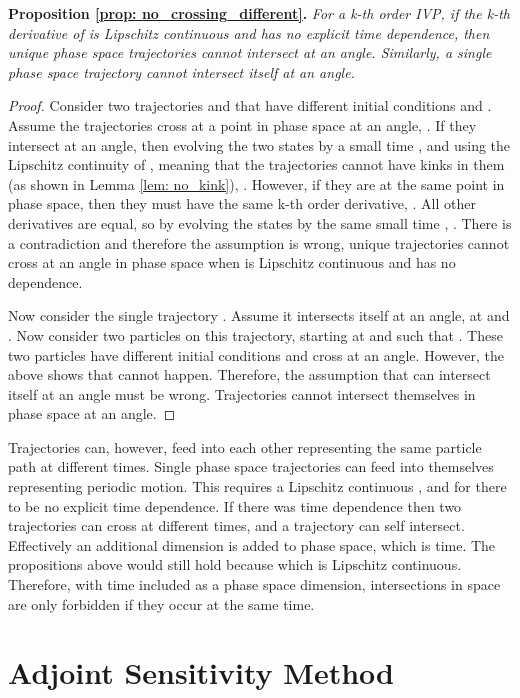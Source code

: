 \documentclass{article}
\theoremstyle{remark}
\theoremstyle{definition}
\begin{document}
\textbf{Proposition \ref{prop: no_crossing_different}.} \textit{For a k-th order IVP, if the k-th derivative of  is Lipschitz continuous and has no explicit time dependence, then unique phase space trajectories cannot intersect at an angle. Similarly, a single phase space trajectory cannot intersect itself at an angle.}



\begin{proof}
Consider two trajectories  and  that have different initial conditions  and . Assume the trajectories cross at a point in phase space at an angle, . If they intersect at an angle, then evolving the two states by a small time , and using the Lipschitz continuity of , meaning that the trajectories cannot have kinks in them (as shown in Lemma \ref{lem: no_kink}), . However, if they are at the same point in phase space, then they must have the same k-th order derivative, . All other derivatives are equal, so by evolving the states by the same small time , . There is a contradiction  and therefore the assumption is wrong, unique trajectories cannot cross at an angle in phase space when  is Lipschitz continuous and has no  dependence.

Now consider the single trajectory . Assume it intersects itself at an angle, at  and . Now consider two particles on this trajectory, starting at  and  such that . These two particles have different initial conditions and cross at an angle. However, the above shows that cannot happen. Therefore, the assumption that  can intersect itself at an angle must be wrong. Trajectories cannot intersect themselves in phase space at an angle.
\end{proof}


Trajectories can, however, feed into each other representing the same particle path at different times. Single phase space trajectories can feed into themselves representing periodic motion. This requires a Lipschitz continuous , and for there to be no explicit time dependence. If there was time dependence then two trajectories can cross at different times, and a trajectory can self intersect. Effectively an additional dimension is added to phase space, which is time. The propositions above would still hold because  which is Lipschitz continuous. Therefore, with time included as a phase space dimension, intersections in space are only forbidden if they occur at the same time.


\section{Adjoint Sensitivity Method}
\label{app: adjoint_method}
\end{document}

